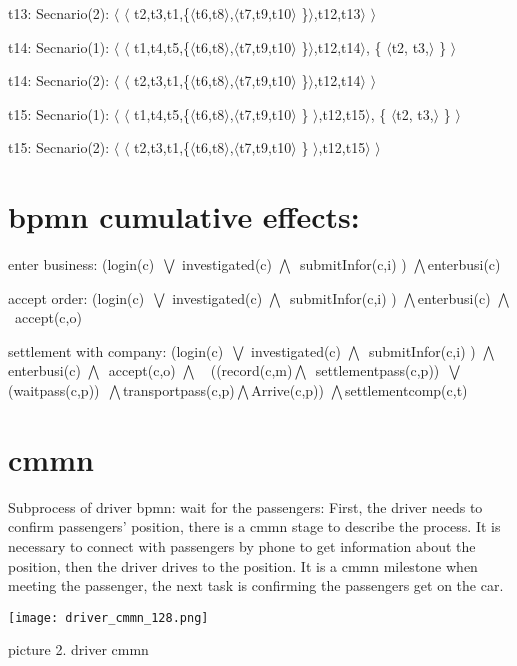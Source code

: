 \documentclass[runningheads]{llncs}
\begin{document}
\noindent t13: Secnario(2): $\langle$  $\langle$  t2,t3,t1,\{$\langle$t6,t8$\rangle$,$\langle$t7,t9,t10$\rangle$ \}$\rangle$,t12,t13$\rangle$	$\rangle$

\noindent t14: Secnario(1): $\langle$  $\langle$  t1,t4,t5,\{$\langle$t6,t8$\rangle$,$\langle$t7,t9,t10$\rangle$ \}$\rangle$,t12,t14$\rangle$, \{  $\langle$t2, t3,$\rangle$   \}  $\rangle$

\noindent t14: Secnario(2): $\langle$  $\langle$  t2,t3,t1,\{$\langle$t6,t8$\rangle$,$\langle$t7,t9,t10$\rangle$ \}$\rangle$,t12,t14$\rangle$	$\rangle$

\noindent t15: Secnario(1): $\langle$  $\langle$  t1,t4,t5,\{$\langle$t6,t8$\rangle$,$\langle$t7,t9,t10$\rangle$ \} $\rangle$,t12,t15$\rangle$, \{  $\langle$t2, t3,$\rangle$   \}	$\rangle$

\noindent t15: Secnario(2): $\langle$  $\langle$  t2,t3,t1,\{$\langle$t6,t8$\rangle$,$\langle$t7,t9,t10$\rangle$ \} $\rangle$,t12,t15$\rangle$	$\rangle$





\section{bpmn cumulative effects:}

enter business: (login(c)\ $\bigvee$ investigated(c) $\bigwedge$\ submitInfor(c,i) ) $\bigwedge$enterbusi(c)

\noindent accept order: (login(c)\ $\bigvee$ investigated(c) $\bigwedge$\ submitInfor(c,i) ) $\bigwedge$enterbusi(c) $\bigwedge$\  accept(c,o)

\noindent settlement with company: (login(c)\ $\bigvee$ investigated(c) $\bigwedge$\ submitInfor(c,i) ) $\bigwedge$enterbusi(c) $\bigwedge$\  accept(c,o) $\bigwedge$\ \ ((record(c,m)$\bigwedge$\ settlementpass(c,p))\ $\bigvee$(waitpass(c,p))\ $\bigwedge$transportpass(c,p)$\bigwedge$Arrive(c,p)) $\bigwedge$settlementcomp(c,t)




\section{cmmn}
\noindent Subprocess of driver bpmn: wait for the passengers:
First, the driver needs to confirm passengers’ position, there is a cmmn stage to describe the process. It is necessary to connect with passengers by phone to get information about the position, then the driver drives to the position. It is a cmmn milestone when meeting the passenger, the next task is confirming the passengers get on the car.
\centerline{\texttt{[image: driver\_cmmn\_128.png]}}
\centerline{picture 2. driver cmmn}
\end{document}
